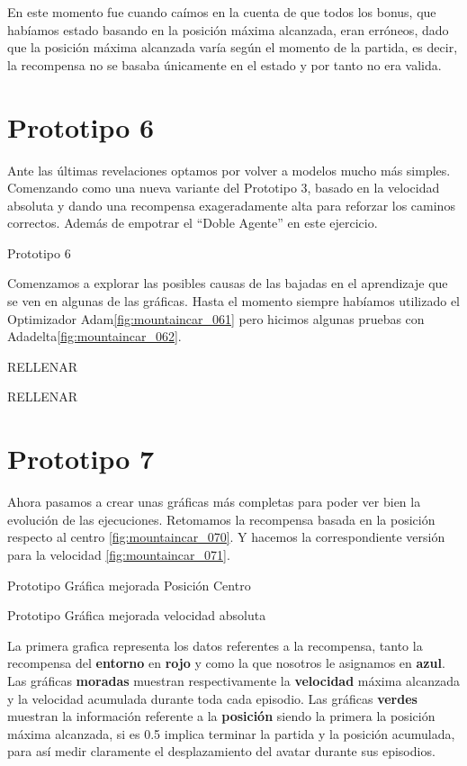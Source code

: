 En este momento fue cuando caímos en la cuenta de que todos los bonus, que habíamos estado basando en la posición máxima alcanzada, eran erróneos, dado que la posición máxima alcanzada varía según el momento de la partida, es decir, la recompensa no se basaba únicamente en el estado y por tanto no era valida.

\section{Prototipo 6}
Ante las últimas revelaciones optamos por volver a modelos mucho más simples. Comenzando como una nueva variante del Prototipo 3, basado en la velocidad absoluta y dando una recompensa exageradamente alta para reforzar los caminos correctos. Además de empotrar el ``Doble Agente'' en este ejercicio.

%
{Prototipo 6}

Comenzamos a explorar las posibles causas de las bajadas en el aprendizaje que se ven en algunas de las gráficas.
Hasta el momento siempre habíamos utilizado el Optimizador Adam\ref{fig:mountaincar_061} pero hicimos algunas pruebas con Adadelta\ref{fig:mountaincar_062}.

%
{RELLENAR}

%
{RELLENAR}

\section{Prototipo 7}
Ahora pasamos a crear unas gráficas más completas para poder ver bien la evolución de las ejecuciones.
Retomamos la recompensa basada en la posición respecto al centro \ref{fig:mountaincar_070}. Y hacemos la correspondiente versión para la velocidad \ref{fig:mountaincar_071}.

%
{Prototipo Gráfica mejorada Posición Centro}

%
{Prototipo Gráfica mejorada velocidad absoluta}

La primera grafica representa los datos referentes a la recompensa, tanto la recompensa del \textbf{entorno} en \textbf{rojo} y como la que nosotros le asignamos en \textbf{azul}.
Las gráficas \textbf{moradas} muestran respectivamente la \textbf{velocidad} máxima alcanzada y la velocidad acumulada durante toda cada episodio.
Las gráficas \textbf{verdes} muestran la información referente a la \textbf{posición} siendo la primera la posición máxima alcanzada, si es 0.5 implica terminar la partida y la posición acumulada, para así medir claramente el desplazamiento del avatar durante sus episodios.

